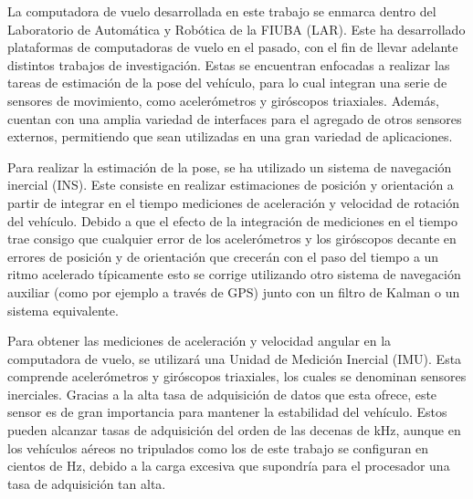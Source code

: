 
La computadora de vuelo desarrollada en este trabajo se enmarca dentro del Laboratorio de Automática y Robótica de la FIUBA (LAR). Este ha desarrollado plataformas de computadoras de vuelo en el pasado, con el fin de llevar adelante distintos trabajos de investigación. Estas se encuentran enfocadas a realizar las tareas de estimación de la pose del vehículo, para lo cual integran una serie de sensores de movimiento, como acelerómetros y giróscopos triaxiales. Además, cuentan con una amplia variedad de interfaces para el agregado de otros sensores externos, permitiendo que sean utilizadas en una gran variedad de aplicaciones.

Para realizar la estimación de la pose, se ha utilizado un sistema de navegación inercial (INS). Este consiste en realizar estimaciones de posición y orientación a partir de integrar en el tiempo mediciones de aceleración y velocidad de rotación del vehículo. Debido a que el efecto de la integración de mediciones en el tiempo trae consigo que cualquier error de los acelerómetros y los giróscopos decante en errores de posición y de orientación que crecerán con el paso del tiempo a un ritmo acelerado típicamente esto se corrige utilizando otro sistema de navegación auxiliar (como por ejemplo a través de GPS) junto con un filtro de Kalman o un sistema equivalente.

Para obtener las mediciones de aceleración y velocidad angular en la computadora de vuelo, se utilizará una Unidad de Medición Inercial (IMU). Esta comprende acelerómetros y giróscopos triaxiales, los cuales se denominan sensores inerciales. Gracias a la alta tasa de adquisición de datos que esta ofrece, este sensor es de gran importancia para mantener la estabilidad del vehículo. Estos pueden alcanzar tasas de adquisición del orden de las decenas de kHz, aunque en los vehículos aéreos no tripulados como los de este trabajo se configuran en cientos de Hz, debido a la carga excesiva que supondría para el procesador una tasa de adquisición tan alta.

